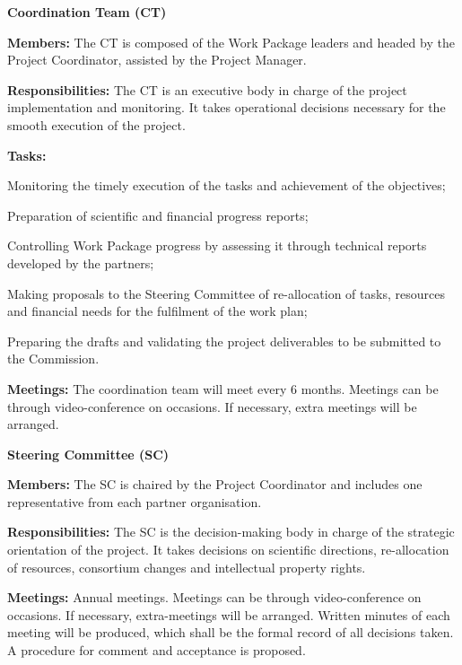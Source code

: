 \begin{description}
\item{\textbf{Coordination Team (CT)}} \nobreak\par
\textbf{Members:} The CT is composed of the Work Package leaders
and headed by the Project Coordinator, assisted by the Project
Manager.

\textbf{Responsibilities:} The CT is an executive body in charge of
the project implementation and monitoring.
It takes operational decisions necessary for the smooth execution of
the project.

\textbf{Tasks:}
\begin{compactenum}
\item Monitoring the timely execution of the tasks and achievement of
  the objectives;
\item Preparation of scientific and financial progress reports;
\item Controlling Work Package progress by assessing it through technical
  reports developed by the partners;
\item Making proposals to the Steering Committee of re-allocation of
  tasks, resources and financial needs for the fulfilment of the work
  plan;
\item Preparing the drafts and validating the project deliverables to
  be submitted to the Commission.
\end{compactenum}

\textbf{Meetings:} The coordination team will meet every 6 months.
Meetings can be through video-conference on occasions.
If necessary, extra meetings will be arranged.

\item{\textbf{Steering Committee (SC)}}\nobreak\par

\textbf{Members:} The SC is chaired by the Project Coordinator
and includes one representative from each partner organisation.

\textbf{Responsibilities:} The SC is the decision-making body in
charge of the strategic orientation of the project.  It takes decisions on scientific
directions, re-allocation of resources, consortium
changes and intellectual property rights.

\textbf{Meetings:} Annual meetings.
Meetings can be through video-conference on occasions.
If necessary, extra-meetings
will be arranged.  Written minutes of each meeting will be produced,
which shall be the formal record of all decisions taken. A procedure
for comment and acceptance is proposed.


\end{description}
